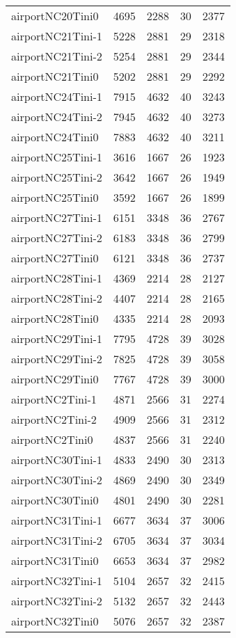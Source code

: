 \begin{longtable}{lrrrr}
airportNC20Tini0 & 4695 & 2288 & 30 & 2377 \\
airportNC21Tini-1 & 5228 & 2881 & 29 & 2318 \\
airportNC21Tini-2 & 5254 & 2881 & 29 & 2344 \\
airportNC21Tini0 & 5202 & 2881 & 29 & 2292 \\
airportNC24Tini-1 & 7915 & 4632 & 40 & 3243 \\
airportNC24Tini-2 & 7945 & 4632 & 40 & 3273 \\
airportNC24Tini0 & 7883 & 4632 & 40 & 3211 \\
airportNC25Tini-1 & 3616 & 1667 & 26 & 1923 \\
airportNC25Tini-2 & 3642 & 1667 & 26 & 1949 \\
airportNC25Tini0 & 3592 & 1667 & 26 & 1899 \\
airportNC27Tini-1 & 6151 & 3348 & 36 & 2767 \\
airportNC27Tini-2 & 6183 & 3348 & 36 & 2799 \\
airportNC27Tini0 & 6121 & 3348 & 36 & 2737 \\
airportNC28Tini-1 & 4369 & 2214 & 28 & 2127 \\
airportNC28Tini-2 & 4407 & 2214 & 28 & 2165 \\
airportNC28Tini0 & 4335 & 2214 & 28 & 2093 \\
airportNC29Tini-1 & 7795 & 4728 & 39 & 3028 \\
airportNC29Tini-2 & 7825 & 4728 & 39 & 3058 \\
airportNC29Tini0 & 7767 & 4728 & 39 & 3000 \\
airportNC2Tini-1 & 4871 & 2566 & 31 & 2274 \\
airportNC2Tini-2 & 4909 & 2566 & 31 & 2312 \\
airportNC2Tini0 & 4837 & 2566 & 31 & 2240 \\
airportNC30Tini-1 & 4833 & 2490 & 30 & 2313 \\
airportNC30Tini-2 & 4869 & 2490 & 30 & 2349 \\
airportNC30Tini0 & 4801 & 2490 & 30 & 2281 \\
airportNC31Tini-1 & 6677 & 3634 & 37 & 3006 \\
airportNC31Tini-2 & 6705 & 3634 & 37 & 3034 \\
airportNC31Tini0 & 6653 & 3634 & 37 & 2982 \\
airportNC32Tini-1 & 5104 & 2657 & 32 & 2415 \\
airportNC32Tini-2 & 5132 & 2657 & 32 & 2443 \\
airportNC32Tini0 & 5076 & 2657 & 32 & 2387 \\

\end{longtable}
